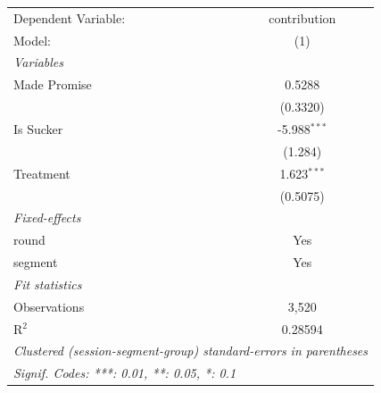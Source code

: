 
\begingroup
\centering
\begin{tabular}{lc}
   \tabularnewline \midrule \midrule
   Dependent Variable: & contribution\\
   Model:              & (1)\\
   \midrule
   \emph{Variables}\\
   Made Promise        & 0.5288\\
                       & (0.3320)\\
   Is Sucker           & -5.988$^{***}$\\
                       & (1.284)\\
   Treatment           & 1.623$^{***}$\\
                       & (0.5075)\\
   \midrule
   \emph{Fixed-effects}\\
   round               & Yes\\
   segment             & Yes\\
   \midrule
   \emph{Fit statistics}\\
   Observations        & 3,520\\
   R$^2$               & 0.28594\\
   \midrule \midrule
   \multicolumn{2}{l}{\emph{Clustered (session-segment-group) standard-errors in parentheses}}\\
   \multicolumn{2}{l}{\emph{Signif. Codes: ***: 0.01, **: 0.05, *: 0.1}}\\
\end{tabular}
\par\endgroup


